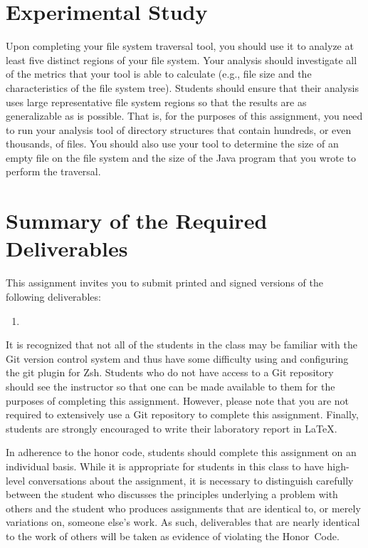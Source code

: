 \section*{Experimental Study}

Upon completing your file system traversal tool, you should use it to analyze at least five distinct regions of your file system.
Your analysis should investigate all of the metrics that your tool is able to calculate (e.g., file size and the characteristics
of the file system tree). Students should ensure that their analysis uses large representative file system regions so that the results
are as generalizable as is possible. That is, for the purposes of this assignment, you need to run your analysis tool of directory
structures that contain hundreds, or even thousands, of files. You should also use your tool to determine the size of an empty
file on the file system and the size of the Java program that you wrote to perform the traversal.

\section*{Summary of the Required Deliverables}

  This assignment invites you to submit printed and signed versions of the following deliverables: 

  \begin{enumerate}
    \item 
  \end{enumerate}

  It is recognized that not all of the students in the class may be familiar with the Git version control system and thus have some
  difficulty using and configuring the git plugin for Zsh.  Students who do not have access to a Git repository should see the
  instructor so that one can be made available to them for the purposes of completing this assignment. However, please note that you
  are not required to extensively use a Git repository to complete this assignment. Finally, students are strongly encouraged to
  write their laboratory report in \LaTeX.

  In adherence to the honor code, students should complete this assignment on an individual basis. While it is appropriate for
  students in this class to have high-level conversations about the assignment, it is necessary to distinguish carefully between the
  student who discusses the principles underlying a problem with others and the student who produces assignments that are identical
  to, or merely variations on, someone else's work.  As such, deliverables that are nearly identical to the work of others will be
  taken as evidence of violating the \mbox{Honor Code}.  



  
